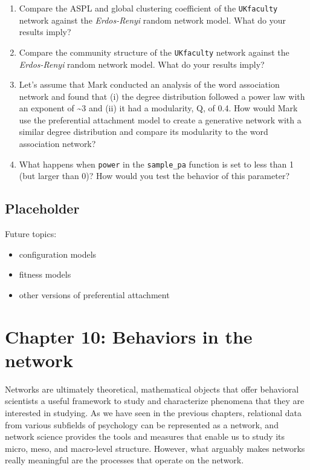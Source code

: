 \documentclass[
]{book}
\providecommand{\tightlist}{%
  \setlength{\itemsep}{0pt}\setlength{\parskip}{0pt}}
\begin{document}
\begin{enumerate}
\def\labelenumi{\arabic{enumi}.}
\item
  Compare the ASPL and global clustering coefficient of the \texttt{UKfaculty} network against the \emph{Erdos-Renyi} random network model. What do your results imply?
\item
  Compare the community structure of the \texttt{UKfaculty} network against the \emph{Erdos-Renyi} random network model. What do your results imply?
\item
  Let's assume that Mark conducted an analysis of the word association network and found that (i) the degree distribution followed a power law with an exponent of \textasciitilde3 and (ii) it had a modularity, Q, of 0.4. How would Mark use the preferential attachment model to create a generative network with a similar degree distribution and compare its modularity to the word association network?
\item
  What happens when \texttt{power} in the \texttt{sample\_pa} function is set to less than 1 (but larger than 0)? How would you test the behavior of this parameter?
\end{enumerate}

\section{Placeholder}\label{placeholder}

Future topics:

\begin{itemize}
\tightlist
\item
  configuration models
\item
  fitness models
\item
  other versions of preferential attachment
\end{itemize}

\chapter{Chapter 10: Behaviors in the network}\label{ch10}

Networks are ultimately theoretical, mathematical objects that offer behavioral scientists a useful framework to study and characterize phenomena that they are interested in studying. As we have seen in the previous chapters, relational data from various subfields of psychology can be represented as a network, and network science provides the tools and measures that enable us to study its micro, meso, and macro-level structure. However, what arguably makes networks really meaningful are the processes that operate on the network.
\end{document}
